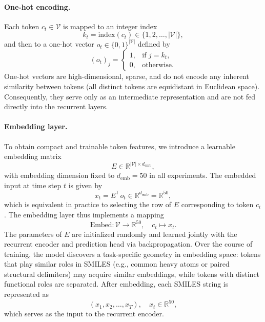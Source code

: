 \documentclass[11pt,a4paper]{article}
\begin{document}
\paragraph{One-hot encoding.}
Each token $c_t \in \mathcal{V}$ is mapped to an integer index
\begin{equation}
  k_t = \text{index}(c_t) \in \{1, 2, \dots, |\mathcal{V}|\},
\end{equation}
and then to a one-hot vector $o_t \in \{0,1\}^{|\mathcal{V}|}$ defined by
\begin{equation}
  (o_t)_j =
  \begin{cases}
    1, & \text{if } j = k_t, \\
    0, & \text{otherwise}.
  \end{cases}
\end{equation}
One-hot vectors are high-dimensional, sparse, and do not encode any inherent similarity between tokens (all distinct tokens are equidistant in Euclidean space). Consequently, they serve only as an intermediate representation and are not fed directly into the recurrent layers.

\paragraph{Embedding layer.}
To obtain compact and trainable token features, we introduce a learnable embedding matrix
\begin{equation}
  E \in \mathbb{R}^{|\mathcal{V}| \times d_{\mathrm{emb}}},
\end{equation}
with embedding dimension fixed to $d_{\mathrm{emb}} = 50$ in all experiments. The embedded input at time step $t$ is given by
\begin{equation}
  x_t = E^{\top} o_t \in \mathbb{R}^{d_{\mathrm{emb}}} = \mathbb{R}^{50},
\end{equation}
which is equivalent in practice to selecting the row of $E$ corresponding to token $c_t$. The embedding layer thus implements a mapping
\begin{equation}
  \text{Embed} : \mathcal{V} \to \mathbb{R}^{50}, \quad c_t \mapsto x_t.
\end{equation}
The parameters of $E$ are initialized randomly and learned jointly with the recurrent encoder and prediction head via backpropagation. Over the course of training, the model discovers a task-specific geometry in embedding space: tokens that play similar roles in SMILES (e.g., common heavy atoms or paired structural delimiters) may acquire similar embeddings, while tokens with distinct functional roles are separated. After embedding, each SMILES string is represented as
\begin{equation}
  (x_1, x_2, \dots, x_T), \quad x_t \in \mathbb{R}^{50},
\end{equation}
which serves as the input to the recurrent encoder.
\end{document}

